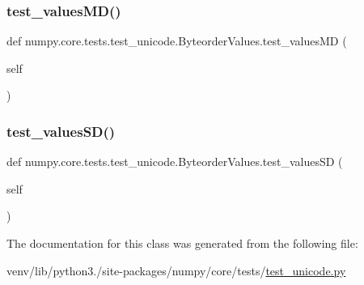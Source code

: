 \subsubsection{\texorpdfstring{test\+\_\+values\+M\+D()}{test\_valuesMD()}}
{\footnotesize\ttfamily def numpy.\+core.\+tests.\+test\+\_\+unicode.\+Byteorder\+Values.\+test\+\_\+values\+MD (\begin{DoxyParamCaption}\item[{}]{self }\end{DoxyParamCaption})}

\mbox{\label{classnumpy_1_1core_1_1tests_1_1test__unicode_1_1ByteorderValues_ac6baf10b7c26e0651ee96a1c1dca7abc}} 
\subsubsection{\texorpdfstring{test\+\_\+values\+S\+D()}{test\_valuesSD()}}
{\footnotesize\ttfamily def numpy.\+core.\+tests.\+test\+\_\+unicode.\+Byteorder\+Values.\+test\+\_\+values\+SD (\begin{DoxyParamCaption}\item[{}]{self }\end{DoxyParamCaption})}



The documentation for this class was generated from the following file\+:\begin{DoxyCompactItemize}
\item 
venv/lib/python3./site-\/packages/numpy/core/tests/\hyperlink{test__unicode_8py}{test\+\_\+unicode.\+py}\end{DoxyCompactItemize}
